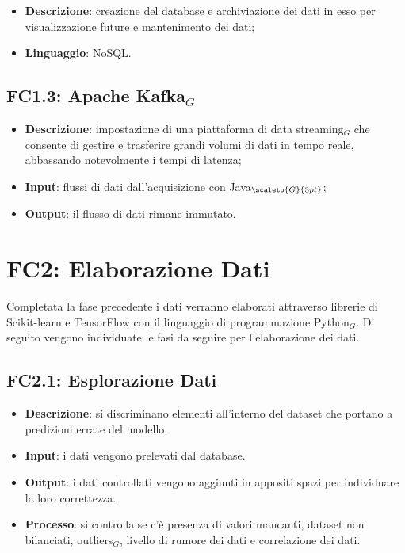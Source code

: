 \begin{itemize}
	\item \textbf{Descrizione}: creazione del database e archiviazione dei dati in esso per visualizzazione future e mantenimento dei dati;
	\item \textbf{Linguaggio}: NoSQL.
\end{itemize}

\subsection{FC1.3: Apache Kafka$_G$}\label{fasiProgettoAquisizioneDatiApacheKafka}

\begin{itemize}
	\item \textbf{Descrizione}: impostazione di una piattaforma di data streaming$_G$ che consente di gestire e trasferire grandi volumi di dati in tempo reale, abbassando notevolmente i tempi di latenza;
	\item \textbf{Input}: flussi di dati dall'acquisizione con Java$_{\scaleto{G}{3pt}}$;
		\item \textbf{Output}: il flusso di dati rimane immutato.
\end{itemize}


\section{FC2: Elaborazione Dati}\label{fasiProgettoElaborazioneDati}
Completata la fase precedente i dati verranno elaborati attraverso librerie di Scikit-learn e TensorFlow con il linguaggio di programmazione Python$_G$.
Di seguito vengono individuate le fasi da seguire per l'elaborazione dei dati.

\subsection{FC2.1: Esplorazione Dati}\label{fasiProgettoElaborazioneDatiEsplorazioneDati}

\begin{itemize}
	\item \textbf{Descrizione}: si discriminano elementi all'interno del dataset che portano a predizioni errate del modello.
	\item \textbf{Input}: i dati vengono prelevati dal database.
	\item \textbf{Output}: i dati controllati vengono aggiunti in appositi spazi per individuare la loro correttezza.
	\item \textbf{Processo}: si controlla se c'è presenza di valori mancanti, dataset non bilanciati, outliers$_G$, livello di rumore dei dati e correlazione dei dati.
\end{itemize}

